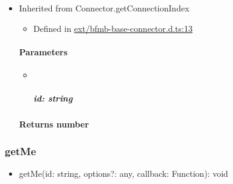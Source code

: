 \documentclass[]{article}
\providecommand{\tightlist}{%
  \setlength{\itemsep}{0pt}\setlength{\parskip}{0pt}}
\let\oldparagraph\paragraph
\renewcommand{\paragraph}[1]{\oldparagraph{#1}\mbox{}}
\let\oldsubparagraph\subparagraph
\renewcommand{\subparagraph}[1]{\oldsubparagraph{#1}\mbox{}}
\begin{document}
\begin{itemize}
\item
  Inherited from Connector.getConnectionIndex

  \begin{itemize}
  \tightlist
  \item
    Defined in
    \href{https://github.com/BFMBFramework/TadoConnector/blob/f05932b/src/ext/bfmb-base-connector.d.ts\#L13}{ext/bfmb-base-connector.d.ts:13}
  \end{itemize}

  \hypertarget{parameters-4}{%
  \paragraph{Parameters}\label{parameters-4}}

  \begin{itemize}
  \item ~
    \hypertarget{id-string-1}{%
    \subparagraph{\texorpdfstring{id:
    {string}}{id: string}}\label{id-string-1}}
  \end{itemize}

  \hypertarget{returns-number}{%
  \paragraph{\texorpdfstring{Returns
  {number}}{Returns number}}\label{returns-number}}
\end{itemize}

\protect\hypertarget{getme}{}{}

\hypertarget{getme}{%
\subsubsection{getMe}\label{getme}}

\begin{itemize}
\tightlist
\item
  getMe{(}id{: }{string}, options{?: }{any}, callback{: }{Function}{)}{:
  }{void}
\end{itemize}
\end{document}
